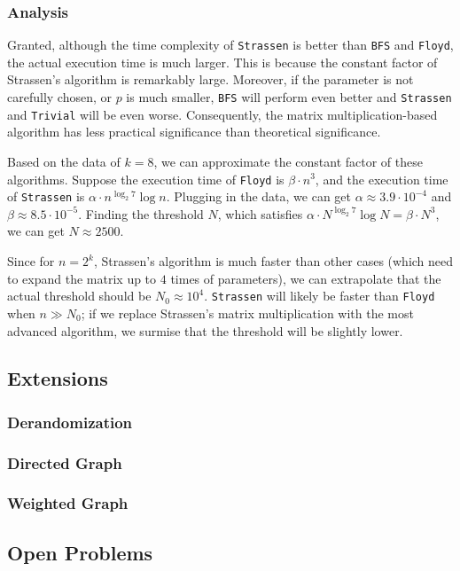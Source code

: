 \documentclass[12pt]{article}
\begin{document}
\subsubsection{Analysis}

Granted, although the time complexity of \texttt{Strassen} is better than \texttt{BFS} and \texttt{Floyd}, the actual execution time is much larger. This is because the constant factor of Strassen's algorithm is remarkably large. Moreover, if the parameter is not carefully chosen, or $p$ is much smaller, \texttt{BFS} will perform even better and \texttt{Strassen} and \texttt{Trivial} will be even worse. Consequently, the matrix multiplication-based algorithm has less practical significance than theoretical significance.

Based on the data of $k=8$, we can approximate the constant factor of these algorithms. Suppose the execution time of \texttt{Floyd} is $\beta\cdot n^3$, and the execution time of \texttt{Strassen} is $\alpha\cdot n^{\log_2 7}\log n$. Plugging in the data, we can get $\alpha\approx 3.9\cdot 10^{-4}$ and $\beta\approx 8.5\cdot 10^{-5}$. Finding the threshold $N$, which satisfies $\alpha\cdot N^{\log_2 7}\log N=\beta\cdot N^3$, we can get $N\approx 2500$. 

Since for $n=2^k$, Strassen's algorithm is much faster than other cases (which need to expand the matrix up to $4$ times of parameters), we can extrapolate that the actual threshold should be $N_0\approx 10^4$. \texttt{Strassen} will likely be faster than \texttt{Floyd} when $n\gg N_0$; if we replace Strassen's matrix multiplication with the most advanced algorithm, we surmise that the threshold will be slightly lower.

\subsection{Extensions}

\subsubsection{Derandomization}
\subsubsection{Directed Graph}
\subsubsection{Weighted Graph}

\subsection{Open Problems}
\end{document}
